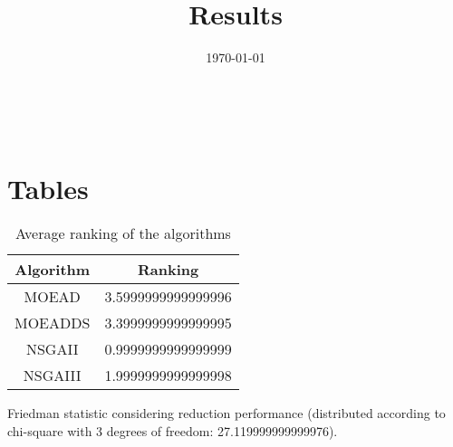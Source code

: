 \documentclass{article}
\title{Results}
\author{}
\date{\today}
\begin{document}
\oddsidemargin 0in \topmargin 0in\maketitle
\
\section{Tables}
\begin{table}[!htp]
\centering
\caption{Average ranking of the algorithms}
\begin{tabular}{c|c}
Algorithm&Ranking\\
\hline
MOEAD&3.5999999999999996\\
MOEADDS&3.3999999999999995\\
NSGAII&0.9999999999999999\\
NSGAIII&1.9999999999999998\\
\end{tabular}
\end{table}


Friedman statistic considering reduction performance (distributed according to chi-square with 3 degrees of freedom: 27.119999999999976).
\end{document}
